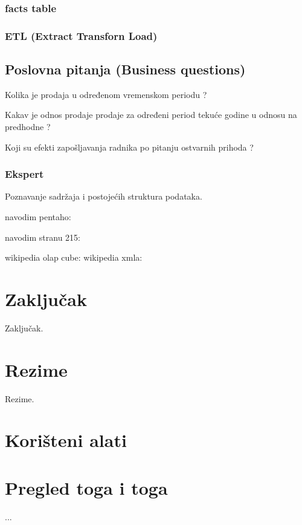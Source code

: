 \documentclass[times, utf8, seminar]{fit}
\begin{document}
\subsection{facts table}



\subsection{ETL (Extract Transforn Load)}




\section{Poslovna pitanja (Business questions)}

Kolika je prodaja u određenom vremenskom periodu ?

Kakav je odnos prodaje prodaje za određeni period tekuće godine u odnosu na predhodne ?

Koji su efekti zapošljavanja radnika po pitanju ostvarnih prihoda ?


\subsection{Ekspert}

Poznavanje sadržaja i postojećih struktura podataka.





navodim pentaho: \cite{pentaho32}

navodim stranu 215: \cite[str.~215]{pentaho32}

wikipedia olap cube: \cite{web:wikipedia:olap_cube}
wikipedia xmla: \cite{web:wikipedia:xmla}

\chapter{Zaključak}
Zaključak.




\chapter{Rezime}
Rezime.

\appendix

\chapter{Korišteni alati}

\chapter{Pregled toga i toga}

...
\end{document}
